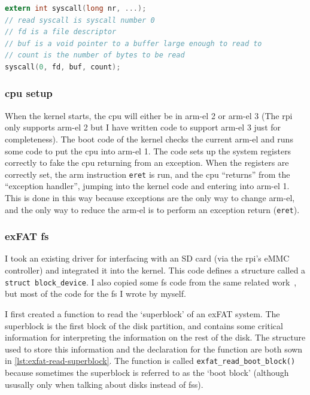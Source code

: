 \documentclass{article}
\begin{document}
\begin{lstlisting}[language=C,
                   caption={How some C code would invoke the system call
                   \texttt{read} in the current implementation.},
                   float,
                   label={lst:syscall-example-read}]
extern int syscall(long nr, ...);
// read syscall is syscall number 0
// fd is a file descriptor
// buf is a void pointer to a buffer large enough to read to
// count is the number of bytes to be read
syscall(0, fd, buf, count);
\end{lstlisting}

\subsubsection{\texorpdfstring{\gls{cpu}}{CPU} setup}
\label{sec:impl_cpu_setup}
When the kernel starts, the \gls{cpu} will either be in \gls{arm-el} 2 or
\gls{arm-el} 3 (The \gls{rpi} only supports \gls{arm-el} 2 but I have written
code to support \gls{arm-el} 3 just for completeness). The boot code of the
kernel checks the current \gls{arm-el} and runs some code to put the \gls{cpu}
into \gls{arm-el} 1. The code sets up the system registers correctly to fake
the \gls{cpu} returning from an exception. When the registers are correctly
set, the \gls{arm} instruction \texttt{eret} is run, and the \gls{cpu}
``returns'' from the ``exception handler'', jumping into the kernel code and
entering into \gls{arm-el} 1. This is done in this way because exceptions are
the only way to change \gls{arm-el}, and the only way to reduce the
\gls{arm-el} is to perform an exception return (\texttt{eret}).

\subsubsection{exFAT \texorpdfstring{\gls{fs}}{Filesystem}}
\label{sec:impl_fs}
I took an existing driver for interfacing with an SD card (via the \gls{rpi}'s
eMMC controller) and integrated it into the kernel. This code defines a
structure called a \verb!struct block_device!. I also copied some \gls{fs} code
from the same related work~\cite{rpi-boot-gh}, but most of the code for the
\gls{fs} I wrote by myself.

I first created a function to read the `superblock' of an exFAT system. The
superblock is the first block of the disk partition, and contains some critical
information for interpreting the information on the rest of the disk. The
structure used to store this information and the declaration for the function
are both sown in \autoref{lst:exfat-read-superblock}. The function is called
\verb!exfat_read_boot_block()! because sometimes the superblock is referred to
as the `boot block' (although ususally only when talking about disks instead of
\glspl{fs}).
\end{document}
